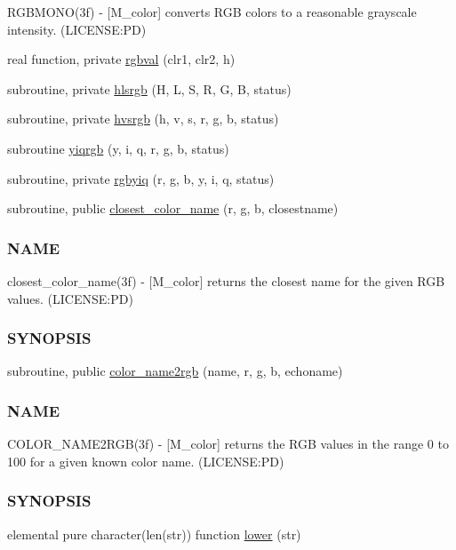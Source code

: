\begin{DoxyCompactItemize}
\begin{DoxyCompactList}
R\+G\+B\+M\+O\+N\+O(3f) -\/ \mbox{[}M\+\_\+color\mbox{]} converts R\+GB colors to a reasonable grayscale intensity. (L\+I\+C\+E\+N\+SE\+:PD) \end{DoxyCompactList}\item 
real function, private \mbox{\hyperlink{namespacem__color_a3e97e24dba7b820f685f13eaa64a6caa}{rgbval}} (clr1, clr2, h)
\item 
subroutine, private \mbox{\hyperlink{namespacem__color_a40e6c91da216384eded2157cdaf86eba}{hlsrgb}} (H, L, S, R, G, B, status)
\item 
subroutine, private \mbox{\hyperlink{namespacem__color_a334ec90d94bbfb9a4c08c5f9efdb8c47}{hvsrgb}} (h, v, s, r, g, b, status)
\item 
subroutine \mbox{\hyperlink{namespacem__color_ac9cd845fb9975144a6deb3a21ce29a29}{yiqrgb}} (y, i, q, r, g, b, status)
\item 
subroutine, private \mbox{\hyperlink{namespacem__color_a386d004a1392b7e01ff66f1676d43def}{rgbyiq}} (r, g, b, y, i, q, status)
\item 
subroutine, public \mbox{\hyperlink{namespacem__color_acad72628ee0b77cf87f40cd46734fb18}{closest\+\_\+color\+\_\+name}} (r, g, b, closestname)
\begin{DoxyCompactList}\small\item\em \subsubsection*{N\+A\+ME}

closest\+\_\+color\+\_\+name(3f) -\/ \mbox{[}M\+\_\+color\mbox{]} returns the closest name for the given R\+GB values. (L\+I\+C\+E\+N\+SE\+:PD) \subsubsection*{S\+Y\+N\+O\+P\+S\+IS}\end{DoxyCompactList}\item 
subroutine, public \mbox{\hyperlink{namespacem__color_a84a36043d278bc56a7148483a862dec8}{color\+\_\+name2rgb}} (name, r, g, b, echoname)
\begin{DoxyCompactList}\small\item\em \subsubsection*{N\+A\+ME}

C\+O\+L\+O\+R\+\_\+\+N\+A\+M\+E2\+R\+G\+B(3f) -\/ \mbox{[}M\+\_\+color\mbox{]} returns the R\+GB values in the range 0 to 100 for a given known color name. (L\+I\+C\+E\+N\+SE\+:PD) \subsubsection*{S\+Y\+N\+O\+P\+S\+IS}\end{DoxyCompactList}\item 
elemental pure character(len(str)) function \mbox{\hyperlink{namespacem__color_a704e93b42d777a827ec557c92d2dd7dc}{lower}} (str)
\end{DoxyCompactItemize}


